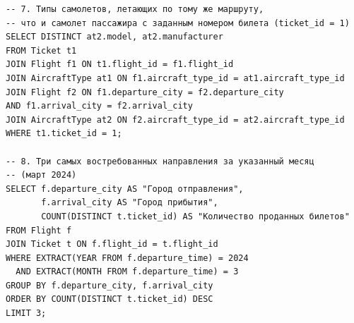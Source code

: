 \documentclass[a4paper,12pt]{article}
\begin{document}
\begin{verbatim}
-- 7. Типы самолетов, летающих по тому же маршруту, 
-- что и самолет пассажира с заданным номером билета (ticket_id = 1)
SELECT DISTINCT at2.model, at2.manufacturer
FROM Ticket t1
JOIN Flight f1 ON t1.flight_id = f1.flight_id
JOIN AircraftType at1 ON f1.aircraft_type_id = at1.aircraft_type_id
JOIN Flight f2 ON f1.departure_city = f2.departure_city 
AND f1.arrival_city = f2.arrival_city
JOIN AircraftType at2 ON f2.aircraft_type_id = at2.aircraft_type_id
WHERE t1.ticket_id = 1;

-- 8. Три самых востребованных направления за указанный месяц
-- (март 2024)
SELECT f.departure_city AS "Город отправления", 
       f.arrival_city AS "Город прибытия", 
       COUNT(DISTINCT t.ticket_id) AS "Количество проданных билетов"
FROM Flight f
JOIN Ticket t ON f.flight_id = t.flight_id
WHERE EXTRACT(YEAR FROM f.departure_time) = 2024 
  AND EXTRACT(MONTH FROM f.departure_time) = 3
GROUP BY f.departure_city, f.arrival_city
ORDER BY COUNT(DISTINCT t.ticket_id) DESC
LIMIT 3;
\end{verbatim}
\end{document}
